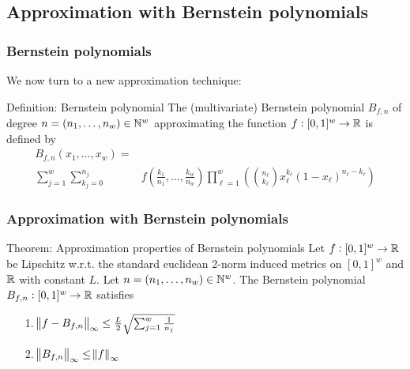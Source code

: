 \documentclass{beamer}[10]
\begin{document}
\subsection{Approximation with Bernstein polynomials}

\begin{frame}
  \frametitle{Bernstein polynomials}
  We now turn to a new approximation technique:
  \begingroup
  \footnotesize
  \begin{block}{Definition: Bernstein polynomial}
    The (multivariate) Bernstein polynomial $B_{f, n}$ of degree
    $n=(n_1, \dots, n_w) \in \mathbb{N}^w$ approximating the function $f:[0,1]^w \to \mathbb{R}$
    is defined by
    \begin{align*}
      B_{f, n}(x_1, \dots, x_w) = &
      \\ \sum_{j = 1}^w \sum_{k_j = 0}^{n_j} &
      f\left( \frac{k_1}{n_1}, \dots, \frac{k_w}{n_w} \right)
      \prod_{\ell = 1}^w \left(
      \binom{n_\ell}{k_\ell} x_\ell^{k_\ell}(1-x_\ell)^{n_\ell - k_\ell} \right)
    \end{align*}
  \end{block}
  \endgroup
\end{frame}

\begin{frame}
  \frametitle{Approximation with Bernstein polynomials}
  \begin{block}{Theorem: Approximation properties of Bernstein polynomials}
    Let $f : [0,1]^w \to \mathbb{R}$ be Lipschitz
    w.r.t. the standard euclidean 2-norm induced metrics on $[0,1]^w$ and $\mathbb{R}$
    with constant $L$. 
    Let $n = (n_1, \dots, n_w) \in \mathbb{N}^w$.
    The Bernstein polynomial
    $B_{f,n} : [0,1]^w \to \mathbb{R}$ satisfies
    \begin{itemize}
      \item[1.] $\norm{f - B_{f,n}}_\infty
	\leq \frac{L}{2} \sqrt{\sum_{j=1}^w \frac{1}{n_j}}$
      \item[2.] $\norm{B_{f,n}}_\infty \leq \norm{f}_\infty$
    \end{itemize}
  \end{block}
\end{frame}
\end{document}
